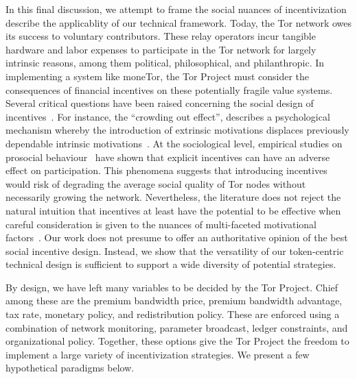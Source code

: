 

In this final discussion, we attempt to frame the social nuances of
incentivization describe the applicablity of our technical framework. Today, the
Tor network owes its success to voluntary contributors. These relay operators
incur tangible hardware and labor expenses to participate in the Tor network for
largely intrinsic reasons, among them political, philosophical, and
philanthropic. In implementing a system like moneTor, the Tor Project must
consider the consequences of financial incentives on these potentially
fragile value systems. Several critical questions have been raised concerning
the social design of incentives~\cite{jansenblogpost}. For instance, the
``crowding out effect'', describes a psychological mechanism whereby the
introduction of extrinsic motivations displaces previously dependable intrinsic
motivations~\cite{10.1257/jep.25.4.191}. At the sociological level, empirical
studies on prosocial behaviour~\cite{10.1257/aer.96.5.1652} have shown that
explicit incentives can have an adverse effect on participation. This phenomena
suggests that introducing incentives would risk of degrading the average social
quality of Tor nodes without necessarily growing the network. Nevertheless, the
literature does not reject the natural intuition that incentives at least have
the potential to be effective when careful consideration is given to the nuances
of multi-faceted motivational factors~\cite{10.1257/aer.96.5.1652}. Our work
does not presume to offer an authoritative opinion of the best social incentive
design. Instead, we show that the versatility of our token-centric technical
design is sufficient to support a wide diversity of potential strategies.

By design, we have left many variables to be decided by the Tor Project. Chief
among these are the premium bandwidth price, premium bandwidth advantage, tax
rate, monetary policy, and redistribution policy. These are enforced using a
combination of network monitoring, parameter broadcast, ledger constraints, and
organizational policy. Together, these options give the Tor Project the freedom
to implement a large variety of incentivization strategies. We present a few
hypothetical paradigms below.

